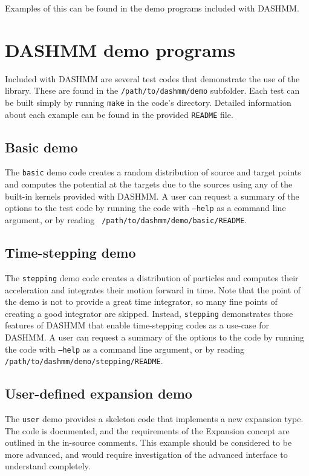 \noindent Examples of this can be found in the demo programs included with
DASHMM.

\section{DASHMM demo programs}

Included with DASHMM are several test codes that demonstrate the use
of the library. These are found in the {\tt /path/to/dashmm/demo}
subfolder. Each test can be built simply by running {\tt make} in the
code's directory. Detailed information about each example can be found in
the provided {\tt README} file.

\subsection{Basic demo}
The {\tt basic} demo code creates a random distribution of source and
target points and computes the potential at the targets due to the
sources using any of the built-in kernels provided with DASHMM. A user
can request a summary of the options to the test code by running the
code with {\tt --help} as a command line argument, or by reading {\tt
  /path/to/dashmm/demo/basic/README}.

\subsection{Time-stepping demo}
The {\tt stepping} demo code creates a distribution of particles and
computes their acceleration and integrates their motion forward in
time. Note that the point of the demo is not to provide a great time
integrator, so many fine points of creating a good integrator are
skipped. Instead, {\tt stepping} demonstrates those features of DASHMM
that enable time-stepping codes as a use-case for DASHMM. A user can
request a summary of the options to the code by running the code with
{\tt --help} as a command line argument, or by reading {\tt
  /path/to/dashmm/demo/stepping/README}.

\subsection{User-defined expansion demo}

The {\tt user} demo provides a skeleton code that implements a new
expansion type. The code is documented, and the requirements of the
Expansion concept are outlined in the in-source comments. This example
should be considered to be more advanced, and would require
investigation of the advanced interface to understand completely.
